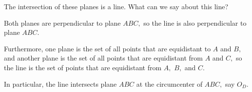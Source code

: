 The intersection of these planes is a line. What can we say about this line?





Both planes are perpendicular to plane $ABC,$ so the line is also perpendicular to plane $ABC.$

Furthermore, one plane is the set of all points that are equidistant to $A$ and $B,$ and another plane is the set of all points that are equidistant from $A$ and $C,$ so the line is the set of points that are equidistant from $A,$ $B,$ and $C.$







In particular, the line intersects plane $ABC$ at the circumcenter of $ABC,$ say $O_D$.




